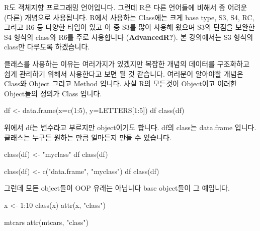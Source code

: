 \documentclass[
  a4paper,
]{book}
\newenvironment{Shaded}{\begin{snugshade}}{\end{snugshade}}
\newcommand{\AttributeTok}[1]{\textcolor[rgb]{0.40,0.45,0.13}{#1}}
\newcommand{\DecValTok}[1]{\textcolor[rgb]{0.68,0.00,0.00}{#1}}
\newcommand{\FunctionTok}[1]{\textcolor[rgb]{0.28,0.35,0.67}{#1}}
\newcommand{\NormalTok}[1]{\textcolor[rgb]{0.00,0.23,0.31}{#1}}
\newcommand{\OtherTok}[1]{\textcolor[rgb]{0.00,0.23,0.31}{#1}}
\newcommand{\SpecialCharTok}[1]{\textcolor[rgb]{0.37,0.37,0.37}{#1}}
\newcommand{\StringTok}[1]{\textcolor[rgb]{0.13,0.47,0.30}{#1}}
\begin{document}
R도 객체지향 프로그래밍 언어입니다. 그런데 R은 다른 언어들에 비해서 좀
어려운 (다른) 개념으로 사용됩니다. R에서 사용하는 Class에는 크게 base
type, S3, S4, RC, 그리고 R6 등 다양한 타입이 있고 이 중 S3를 많이 사용해
왔으며 S3의 단점을 보완한 S4 형식의 class와 R6를 주로 사용합니다
(\textbf{AdvancedR?}). 본 강의에서는 S3 형식의 class만 다루도록
하겠습니다.

클래스를 사용하는 이유는 여러가지가 있겠지만 복잡한 개념의 데이터를
구조화하고 쉽게 관리하기 위해서 사용한다고 보면 될 것 같습니다. 여러분이
알아야할 개념은 Class와 Object 그리고 Method 입니다. 사실 R의 모든것이
Object이고 이러한 Object들의 정의가 Class 입니다.

\begin{Shaded}
\begin{Highlighting}[]
\NormalTok{df }\OtherTok{\textless{}{-}} \FunctionTok{data.frame}\NormalTok{(}\AttributeTok{x=}\FunctionTok{c}\NormalTok{(}\DecValTok{1}\SpecialCharTok{:}\DecValTok{5}\NormalTok{), }\AttributeTok{y=}\NormalTok{LETTERS[}\DecValTok{1}\SpecialCharTok{:}\DecValTok{5}\NormalTok{])}
\NormalTok{df}
\FunctionTok{class}\NormalTok{(df)}
\end{Highlighting}
\end{Shaded}

위에서 df는 변수라고 부르지만 object이기도 합니다. df의 class는
data.frame 입니다. 클래스는 누구든 원하는 만큼 얼마든지 만들 수
있습니다.

\begin{Shaded}
\begin{Highlighting}[]
\FunctionTok{class}\NormalTok{(df) }\OtherTok{\textless{}{-}} \StringTok{"myclass"}
\NormalTok{df}
\FunctionTok{class}\NormalTok{(df)}

\FunctionTok{class}\NormalTok{(df) }\OtherTok{\textless{}{-}} \FunctionTok{c}\NormalTok{(}\StringTok{"data.frame"}\NormalTok{, }\StringTok{"myclass"}\NormalTok{)}
\NormalTok{df}
\FunctionTok{class}\NormalTok{(df)}
\end{Highlighting}
\end{Shaded}

그런데 모든 object들이 OOP 유래는 아닙니다 base object들이 그 예입니다.

\begin{Shaded}
\begin{Highlighting}[]
\NormalTok{x }\OtherTok{\textless{}{-}} \DecValTok{1}\SpecialCharTok{:}\DecValTok{10}
\FunctionTok{class}\NormalTok{(x)}
\FunctionTok{attr}\NormalTok{(x, }\StringTok{"class"}\NormalTok{)}

\NormalTok{mtcars}
\FunctionTok{attr}\NormalTok{(mtcars, }\StringTok{"class"}\NormalTok{)}
\end{Highlighting}
\end{Shaded}
\end{document}
